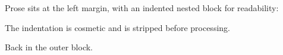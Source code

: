 \begin{outerblock}
Prose sits at the left margin, with an indented nested block for readability:

\begin{innerblock}
The indentation is cosmetic and is stripped before processing.
\end{innerblock}

Back in the outer block.
\end{outerblock}

